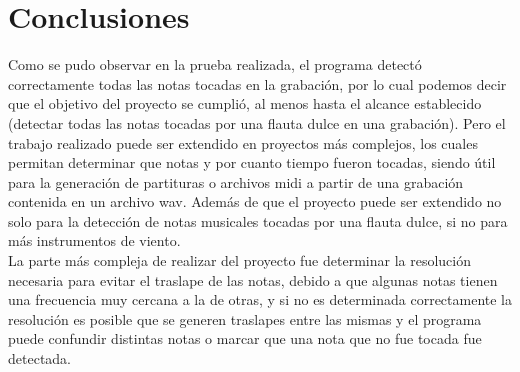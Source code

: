 \section{Conclusiones}
Como se pudo observar en la prueba realizada, el programa detectó correctamente todas las notas tocadas en la grabación, por lo cual podemos decir que el objetivo del proyecto se cumplió, al menos hasta el alcance establecido (detectar todas las notas tocadas por una flauta dulce en una grabación). Pero el trabajo realizado puede ser extendido en proyectos más complejos, los cuales permitan determinar que notas y por cuanto tiempo fueron tocadas, siendo útil para la generación de partituras o archivos midi a partir de una grabación contenida en un archivo wav. Además de que el proyecto puede ser extendido no solo para la detección de notas musicales tocadas por una flauta dulce, si no para más instrumentos de viento.\\ La parte más compleja de realizar del proyecto fue determinar la resolución necesaria para evitar el traslape de las notas, debido a que algunas notas tienen una frecuencia muy cercana a la de otras, y si no es determinada correctamente la resolución es posible que se generen traslapes entre las mismas y el programa puede confundir distintas notas o marcar que una nota que no fue tocada fue detectada.